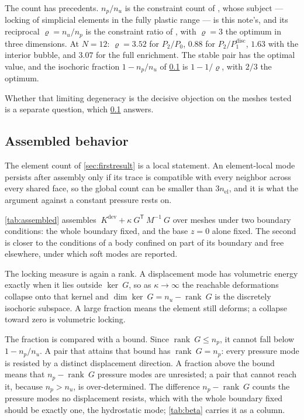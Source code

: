 \documentclass{article}
\newcommand{\transpose}[1]{#1^{\mathsf{T}}}
\newcommand{\supdev}{^{\mathrm{dev}}}
\theoremstyle{definition}
\theoremstyle{plain}
\begin{document}
The count has precedents. $n_p/n_u$ is the constraint count of
\textcite{NagtegaalParksRice:1974}, whose subject --- locking of simplicial
elements in the fully plastic range --- is this note's, and its reciprocal
$\varrho = n_u/n_p$ is the constraint ratio of \textcite[\S4.3.7]{Hughes:1987},
with $\varrho = 3$ the optimum in three dimensions. At $N = 12$:
$\varrho = 3.52$ for $P_2/P_0$, $0.88$ for $P_2/P_1^{\mathrm{disc}}$, $1.63$
with the interior bubble, and $3.07$ for the full enrichment. The stable pair
has the optimal value, and the isochoric fraction $1 - n_p/n_u$ of
\cref{sec:assembled} is $1 - 1/\varrho$, with $2/3$ the optimum.

Whether that limiting degeneracy is the decisive objection on the meshes
tested is a separate question, which \cref{sec:assembled} answers.

\subsection{Assembled behavior}
\label{sec:assembled}

The element count of \cref{sec:firstresult} is a local statement. An
element-local mode persists after assembly only if its trace is compatible
with every neighbor across every shared face, so the global count can be
smaller than $3n_{\mathrm{el}}$, and it is what the argument against a
constant pressure rests on.

\cref{tab:assembled} assembles $~K\supdev + \kappa \transpose{~G} ~M^{-1}
~G$ over meshes under two boundary conditions: the whole boundary fixed, and
the base $z = 0$ alone fixed. The second is closer to the conditions of a body confined
on part of its boundary and free elsewhere, under which soft modes are
reported.

The locking measure is again a rank. A displacement mode has volumetric
energy exactly when it lies outside $\ker ~G$, so as $\kappa \to \infty$ the
reachable deformations collapse onto that kernel and
$\dim\ker ~G = n_u - \operatorname{rank} ~G$ is the discretely isochoric
subspace. A large fraction means the element still deforms; a collapse toward
zero is volumetric locking.

The fraction is compared with a bound. Since
$\operatorname{rank}~G \le n_p$, it cannot fall below $1 - n_p/n_u$. A pair
that attains that bound has $\operatorname{rank}~G = n_p$: every pressure mode
is resisted by a distinct displacement direction. A fraction above the bound
means that $n_p - \operatorname{rank}~G$ pressure modes are unresisted; a pair
that cannot reach it, because $n_p > n_u$, is over-determined. The difference $n_p - \operatorname{rank}~G$ counts the
pressure modes no displacement resists, which with the whole boundary fixed
should be exactly one, the hydrostatic mode; \cref{tab:beta} carries it
as a column.
\end{document}
